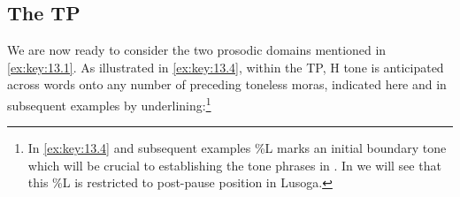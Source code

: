 \documentclass[output=paper]{langsci/langscibook}
\begin{document}
\subsection{The TP}\label{sub:13.2.1}

We are now ready to consider the two prosodic domains mentioned in
\eqref{ex:key:13.1}. As illustrated in \eqref{ex:key:13.4}, within the \gls{TP},
H tone is anticipated across words onto any number of preceding toneless moras,
indicated here and in subsequent examples by underlining:\footnote{In
\eqref{ex:key:13.4} and subsequent examples \%L marks an initial boundary tone which
will be crucial to establishing the tone phrases in . In
 we will see that this \%L is restricted to post-pause
position in Lusoga.}
\end{document}

